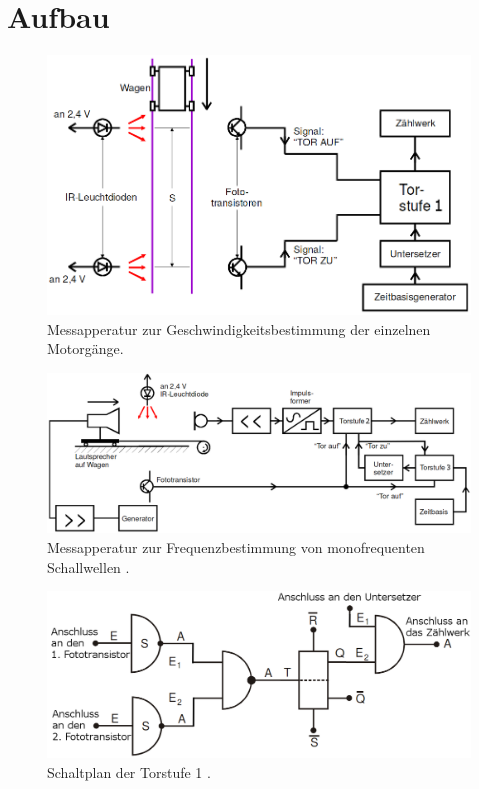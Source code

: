 \section{Aufbau}
\label{sec:Aufbau}
\begin{figure}
	\centering
	\includegraphics[width=\linewidth-50pt,height=\textheight-50pt,keepaspectratio]{content/Bilder/Geschwindigkeitsmessung.png}
	\caption{Messapperatur zur Geschwindigkeitsbestimmung der einzelnen Motorgänge\cite{V104}.}
	\label{fig:Aufbau}
\end{figure}
\begin{figure}
	\centering
	\includegraphics[width=\linewidth-50pt,height=\textheight-50pt,keepaspectratio]{content/Bilder/Frequenzmessung.png}
	\caption{Messapperatur zur Frequenzbestimmung von monofrequenten Schallwellen \cite{V104}.}
	\label{fig:Aufbau2}
\end{figure}
\begin{figure}
	\centering
	\includegraphics[width=\linewidth-50pt,height=\textheight-50pt,keepaspectratio]{content/Bilder/Torstufe1.png}
	\caption{Schaltplan der Torstufe 1 \cite{V104}.}
	\label{fig:Aufbasteve}
\end{figure}
